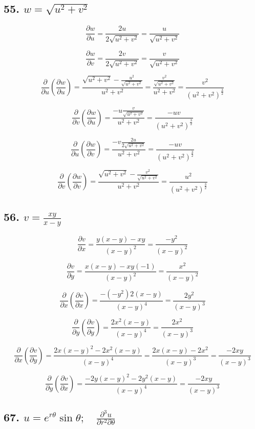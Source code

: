 \documentclass{article}
\begin{document}
    \subsection*{55. $w = \sqrt{u^2 + v^2}$}

    $$\frac{\partial w}{\partial u} = \frac{2u}{2\sqrt{u^2 + v^2}} = \frac{u}{\sqrt{u^2 + v^2}}$$

    $$\frac{\partial w}{\partial v} = \frac{2v}{2\sqrt{u^2 + v^2}} = \frac{v}{\sqrt{u^2 + v^2}}$$

    $$\frac{\partial}{\partial u}(\frac{\partial w}{\partial u}) = \frac{\sqrt{u^2 + v^2} - \frac{u^2}{\sqrt{u^2+v^2}}}{u^2 + v^2} = \frac{\frac{v^2}{\sqrt{u^2+v^2}}}{u^2+v^2} = \frac{v^2}{(u^2+v^2)^{\frac 3 2}}$$

    $$\frac{\partial}{\partial v}(\frac{\partial w}{\partial u}) = \frac{-u\frac{v}{\sqrt{u^2+v^2}}}{u^2+v^2} = \frac{-uv}{(u^2+v^2)^{\frac 3 2}}$$

    $$\frac{\partial}{\partial u}(\frac{\partial w}{\partial v}) = \frac{-v\frac{2u}{2\sqrt{u^2+v^2}}}{u^2+v^2} = \frac{-uv}{(u^2+v^2)^{\frac 3 2}}$$

    $$\frac{\partial}{\partial v}(\frac{\partial w}{\partial v}) = \frac{\sqrt{u^2+v^2} - \frac{v^2}{\sqrt{u^2+v^2}}}{u^2+v^2} = \frac{u^2}{(u^2+v^2)^{\frac 3 2}}$$

    \subsection*{56. $v = \frac{xy}{x - y}$}

    $$\frac{\partial v}{\partial x} = \frac{y(x-y) - xy}{(x-y)^2} = \frac{-y^2}{(x-y)^2}$$

    $$\frac{\partial v}{\partial y} = \frac{x(x-y) - xy(-1)}{(x-y)^2} = \frac{x^2}{(x-y)^2}$$

    $$\frac{\partial }{\partial x}(\frac{\partial v}{\partial x}) = \frac{-(-y^2)2(x-y)}{(x-y)^4} = \frac{2y^2}{(x-y)^3}$$

    $$\frac{\partial }{\partial y}(\frac{\partial v}{\partial y}) = \frac{2x^2 (x-y)}{(x-y)^4} = \frac{2x^2}{(x-y)^3}$$

    $$\frac{\partial }{\partial x}(\frac{\partial v}{\partial y}) = \frac{2x(x-y)^2 - 2x^2 (x-y)}{(x-y)^4} = \frac{2x(x-y) - 2x^2}{(x-y)^3} = \frac{-2xy}{(x-y)^3}$$

    $$\frac{\partial }{\partial y}(\frac{\partial v}{\partial x}) = \frac{-2y(x-y)^2 -2y^2 (x-y)}{(x-y)^4} = \frac{-2xy}{(x-y)^3}$$

    \subsection*{67. $u = e^{r\theta} \sin \theta ; \quad \frac{\partial^3 u}{\partial r^2 \partial \theta}$}
\end{document}
